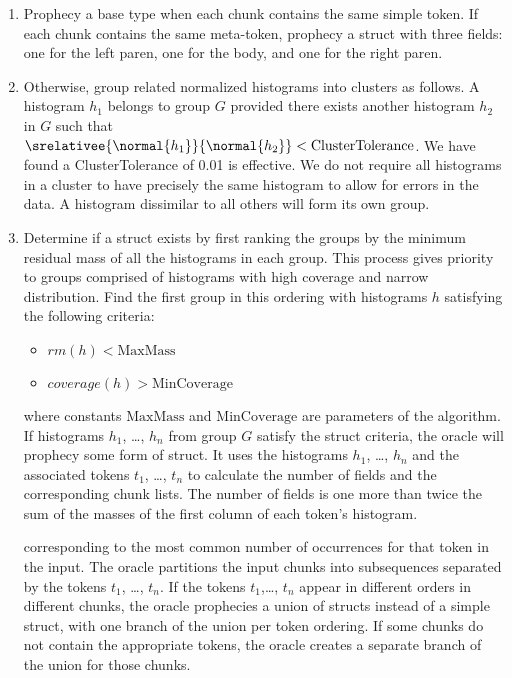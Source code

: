 \begin {enumerate}
\item Prophecy a base type when each chunk contains the same simple
  token. If each chunk contains the same meta-token, prophecy a struct
  with three fields: one for the left paren, one for the body, and one
  for the right paren.

\item Otherwise, group related normalized histograms into clusters as
  follows.  A histogram $h_1$ belongs to group $G$ provided there
  exists another histogram $h_2$ in $G$ such that
  $\srelativee{\normal{h_1}}{\normal{h_2}} <
  \mathrm{ClusterTolerance}$.  We have found a ClusterTolerance of
  0.01 is effective.  We do not require all histograms in a cluster to
  have precisely the same histogram to allow for errors in the data.
  A histogram dissimilar to all others will form its own group.

\item Determine if a struct exists by first ranking the groups by the
  minimum residual mass of all the histograms in each group. This
  process gives priority to groups comprised of histograms with high
  coverage and narrow distribution.  Find the first group in this
  ordering with histograms $h$ satisfying the following criteria:
\begin {itemize}
\item $\mathit{rm}(h) < \mathrm{MaxMass}$
\item $\mathit{coverage}(h) > \mathrm{MinCoverage}$
\end{itemize}
where constants $\mathrm{MaxMass}$ and $\mathrm{MinCoverage}$ are
parameters of the algorithm.  If histograms $h_1$, \ldots, $h_n$ from
group $G$ satisfy the struct criteria, the oracle will prophecy some
form of struct. It uses the histograms $h_1$, \ldots, $h_n$ and the associated
tokens $t_1$, \ldots, $t_n$ to calculate the number of fields and the
corresponding chunk lists.  The number of fields is one more than
twice the sum of the masses of the first column of each token's
histogram. 

 corresponding to 
the most common number of occurrences for that token in the input.
The oracle partitions the input chunks into
subsequences separated by the tokens $t_1$, \ldots, $t_n$. 
If the tokens $t_1$,\ldots, $t_n$
appear in different orders in different chunks, the oracle prophecies
a union of structs instead of a simple struct, with one branch of the
union per token  ordering.  If some chunks do not contain the
appropriate tokens, the oracle creates a separate branch of the union
for those chunks. 


\end{enumerate}
